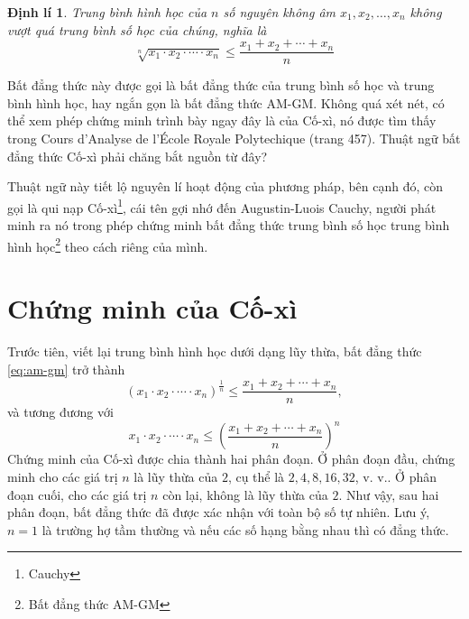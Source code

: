 \documentclass[12pt]{article} %
\newtheorem{theorem}{Định lí} %
\begin{document}
\begin{theorem}
    Trung bình hình học của \(n\) số nguyên không âm \(x_1, x_2,\dots,x_n\) không vượt quá trung bình số học của chúng, nghĩa là
    \begin{equation}
        \sqrt[n]{x_1\cdot x_2\cdot\cdots\cdot x_n} \leq \frac{x_1+x_2+\cdots+x_n}{n} \label{eq:am-gm}
    \end{equation}
\end{theorem}
Bất đẳng thức này được gọi là bất đẳng thức của trung bình số học và trung bình hình học, hay ngắn gọn là bất đẳng thức AM-GM. Không quá xét nét, có thể xem phép chứng minh trình bày ngay đây là của Cố-xì, nó được tìm thấy trong Cours d'Analyse de l'École Royale Polytechique (trang 457). Thuật ngữ bất đẳng thức Cố-xì phải chăng bắt nguồn từ đây?

Thuật ngữ này tiết lộ nguyên lí hoạt động của phương pháp, bên cạnh đó, còn gọi là qui nạp Cố-xì\footnote{Cauchy}, cái tên gợi nhớ đến Augustin-Luois Cauchy, người phát minh ra nó trong phép chứng minh bất đẳng thức trung bình số học trung bình hình học\footnote{Bất đẳng thức AM-GM} theo cách riêng của mình.

\section{Chứng minh của Cố-xì} \label{sec:chung-minh-cua-co-si}
Trước tiên, viết lại trung bình hình học dưới dạng lũy thừa, bất đẳng thức \eqref{eq:am-gm} trở thành 
\[(x_1\cdot x_2\cdot\cdots\cdot x_n)^\frac{1}{n}\leq\frac{x_1+x_2+\cdots+x_n}{n},\]
và tương đương với 
\begin{equation}
    x_1\cdot x_2\cdot\cdots\cdot x_n\leq\left(\frac{x_1+x_2+\cdots+x_n}{n}\right)^n \label{eq:am-gm-dang-luy-thua}
\end{equation}
Chứng minh của Cố-xì được chia thành hai phân đoạn. Ở phân đoạn đầu, chứng minh cho các giá trị \(n\) là lũy thừa của \(2\), cụ thể là \(2,4,8,16,32\), v. v.. Ở phân đoạn cuối, cho các giá trị \(n\) còn lại, không là lũy thừa của \(2\). Như vậy, sau hai phân đoạn, bất đẳng thức đã được xác nhận với toàn bộ số tự nhiên. Lưu ý, \(n=1\) là trường hợ tầm thường và nếu các số hạng bằng nhau thì có đẳng thức.
\end{document}

